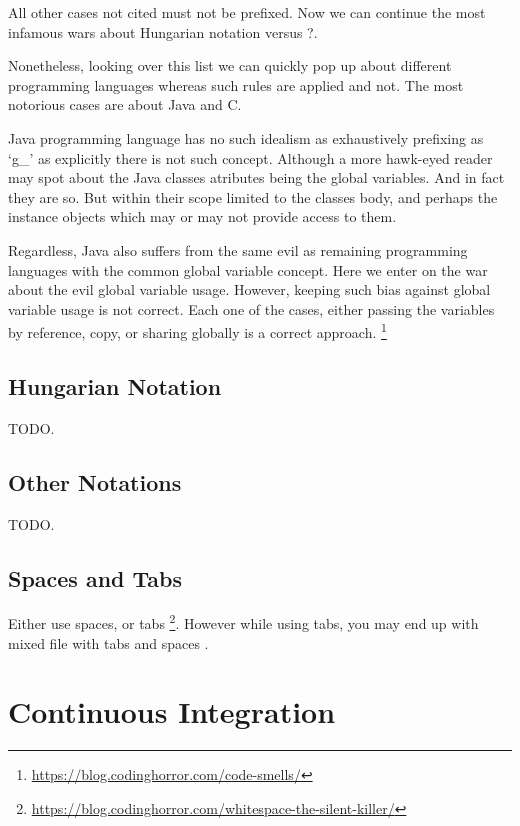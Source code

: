     All other cases not cited must not be prefixed. Now we can continue the most
    infamous wars about Hungarian notation versus ?.

    Nonetheless, looking over this list we can quickly pop up about different
    programming languages whereas such rules are applied and not. The most
    notorious cases are about Java and C.

    Java programming language has no such idealism as exhaustively prefixing as
    `g\_' as explicitly there is not such concept. Although a more hawk-eyed
    reader may spot about the Java classes atributes being the global variables.
    And in fact they are so. But within their scope limited to the classes body,
    and perhaps the instance objects which may or may not provide access to
    them.

    Regardless, Java also suffers from the same evil as remaining programming
    languages with the common global variable concept. Here we enter on the
    war about the evil global variable usage. However, keeping such bias against
    global variable usage is not correct. Each one of the cases, either passing
    the variables by reference, copy, or sharing globally is a correct approach.
    \footnote{\url{https://blog.codinghorror.com/code-smells/}}


    \subsection{Hungarian Notation}

    TODO.


    \subsection{Other Notations}

    TODO.


    \subsection{Spaces and Tabs}

    Either use spaces, or tabs
    \footnote{\url{https://blog.codinghorror.com/whitespace-the-silent-killer/}}.
    However while using tabs,
    you may end up with mixed file with tabs and spaces \cite{tabsAndSpacesConversion}.



    \section{Continuous Integration}

